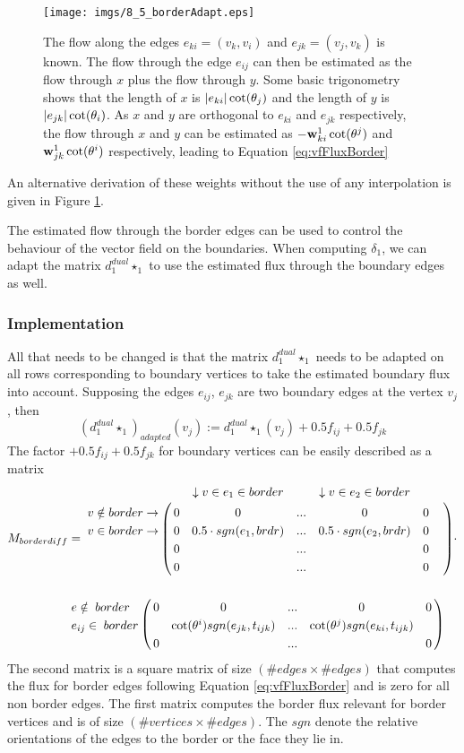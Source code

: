 \begin{figure}
\begin{center}
\texttt{[image: imgs/8\_5\_borderAdapt.eps]}
\end{center}
\caption{The flow along the edges $e_{ki}= (v_k,v_i)$ and $e_{jk} = (v_j, v_k)$ is known. The flow through the edge $e_{ij}$ can then be estimated as the flow through $x$ plus the flow through $y$. Some basic trigonometry shows that the length of $x$ is $\left| e_{ki} \right|\cot(\theta_j)$ and the length of $y$ is $\left| e_{jk} \right|\cot(\theta_i)$. As $x$ and $y$ are orthogonal to $e_{ki}$ and $e_{jk}$ respectively, the flow through $x$ and $y$ can be estimated as $-\textbf{w}^1_{ki} \cot(\theta^j)$ and $\textbf{w}^1_{jk} \cot(\theta^i)$ respectively, leading to Equation \ref{eq:vfFluxBorder}}
\label{fig:8_3_borderWeights}
\end{figure}

An alternative derivation of these weights without the use of any interpolation is given in Figure \ref{fig:8_3_borderWeights}.

The estimated flow through the border edges can be used to control the behaviour of the vector field on the boundaries. When computing $\delta_1$, we can adapt the matrix $d_1^{dual} \star_1$ to use the estimated flux through the boundary edges as well.  
\subsubsection{Implementation}
All that needs to be changed is that the matrix $d_1^{dual} \star_1$ needs to be adapted on all rows corresponding to boundary vertices to take the estimated boundary flux into account. Supposing the edges $e_{ij}$, $e_{jk}$ are two boundary edges at the vertex $v_j$, then
\[(d_1^{dual} \star_1)_{adapted} (v_j) := d_1^{dual} \star_1(v_j) + 0.5 f_{ij} + 0.5 f_{jk}\]
The factor $+ 0.5 f_{ij} + 0.5 f_{jk}$ for boundary vertices can be easily described as a matrix
\begin{align*}M_{borderdiff}& = \bordermatrix{ 
& & \downarrow v \in e_1 \in border & &\downarrow v\in e_{2} \in border& & \cr
v \notin border \rightarrow & 0 & 0& ...& 0& 0 \cr
v\in border \rightarrow & 0 & 0.5 \cdot sgn(e_{1}, brdr) & ... & 0.5 \cdot sgn(e_{2}, brdr)&0\cr
& 0 & & ...& & 0 \cr
& 0 & & ...& & 0
} \cdot \nonumber \\
& \bordermatrix{ 
& & & & &\cr
e \notin \; border & 0 & 0 & ...&0 & 0 \cr
e_{ij} \in\;border& & \cot(\theta^i)sgn(e_{jk}, t_{ijk}) & ... & \cot(\theta^j)sgn(e_{ki}, t_{ijk}) & \cr
& 0 & & ...& & 0
}\end{align*}
The second matrix is a square matrix of size $(\# edges \times \# edges)$ that computes the flux for border edges following Equation \ref{eq:vfFluxBorder} and is zero for all non border edges. The first matrix computes the border flux relevant for border vertices and is of size $(\#vertices \times \#edges)$. The $sgn$ denote the relative orientations of the edges to the border or the face they lie in.

